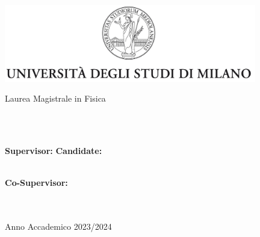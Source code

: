 

\begin{center}
	\includegraphics[width=11cm]{logos/uni.jpg}
	\vspace*{10pt}

	Laurea Magistrale in Fisica\\
	\myDepartment\\
	\vspace*{5pt}

	\vfill

	{\Huge \myTitle}\\
    \vspace*{30pt}

	\vfill

	\textbf{Supervisor:} \hfill \textbf{Candidate:}\\
	\myProf \hfill \myName\\
    \begin{flushleft}
    \textbf{Co-Supervisor:} \\
    \cosupervisor \\
    \cocosupervisor \\
    \end{flushleft}
	\vspace*{15pt}
	Anno Accademico 2023/2024
\end{center}
	
	

\cleardoublepage
\restoregeometry